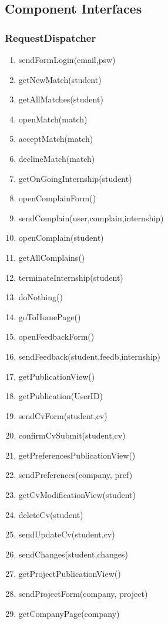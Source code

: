 \documentclass{article}
\begin{document}
\subsection{Component Interfaces}

\subsubsection{RequestDispatcher}
\begin{enumerate}
    \item sendFormLogin(email,psw)
    \item getNewMatch(student)
    \item getAllMatches(student)
    \item openMatch(match)
    \item acceptMatch(match)
    \item declineMatch(match)
    \item getOnGoingInternship(student)
    \item openComplainForm()
    \item sendComplain(user,complain,internship)
    \item openComplain(student)
    \item getAllComplains()
    \item terminateInternship(student)
    \item doNothing()
    \item goToHomePage()
    \item openFeedbackForm()
    \item sendFeedback(student,feedb,internship)
    \item getPublicationView()
    \item getPublication(UserID)
    \item sendCvForm(student,cv)
    \item confirmCvSubmit(student,cv)
    \item getPreferencesPublicationView()
    \item sendPreferences(company, pref)
    \item getCvModificationView(student)
    \item deleteCv(student)
    \item sendUpdateCv(student,cv)
    \item sendChanges(student,changes)
    \item getProjectPublicationView()
    \item sendProjectForm(company, project)
    \item getCompanyPage(company)

\end{enumerate}
\end{document}
